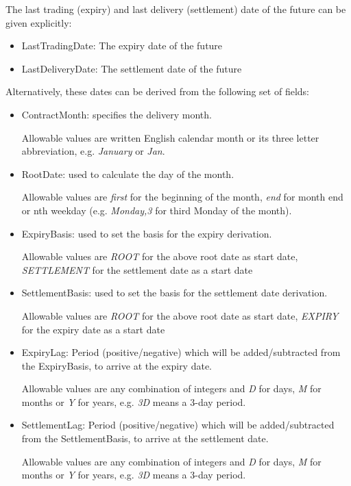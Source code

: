 The last trading (expiry) and last delivery (settlement) date of the future can be given explicitly:

\begin{itemize}
  \item LastTradingDate: The expiry date of the future
  \item LastDeliveryDate: The settlement date of the future
\end{itemize}

Alternatively, these dates can be derived from the following set of fields:

\begin{itemize}
  \item ContractMonth: specifies the delivery month.

  Allowable values are written English calendar month or its three letter abbreviation, e.g. \emph{January} or \emph{Jan}.
  \item RootDate: used to calculate the day of the month.

  Allowable values are \emph{first} for the beginning of the month, \emph{end} for month end or nth weekday (e.g. \emph{Monday,3} for third Monday of the month).
  \item ExpiryBasis: used to set the basis for the expiry derivation.

  Allowable values are \emph{ROOT} for the above root date as start date, \emph{SETTLEMENT} for the settlement date as a start date
  \item SettlementBasis: used to set the basis for the settlement date derivation.

  Allowable values are \emph{ROOT} for the above root date as start date, \emph{EXPIRY} for the expiry date as a start date
  \item ExpiryLag: Period (positive/negative) which will be added/subtracted from the ExpiryBasis, to arrive at the expiry date.

  Allowable values are any combination of integers and \emph{D} for days, \emph{M} for months or \emph{Y} for years, e.g. \emph{3D} means a 3-day period.
  \item SettlementLag: Period (positive/negative) which will be added/subtracted from the SettlementBasis, to arrive at the settlement date.

  Allowable values are any combination of integers and \emph{D} for days, \emph{M} for months or \emph{Y} for years, e.g. \emph{3D} means a 3-day period.
\end{itemize}


